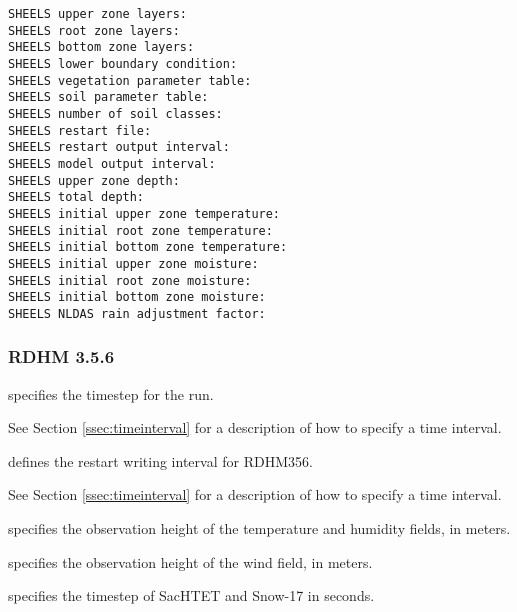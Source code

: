   

  

  

  

  
 

 \begin{Verbatim}[frame=single]
SHEELS upper zone layers:
SHEELS root zone layers:
SHEELS bottom zone layers:
SHEELS lower boundary condition:
SHEELS vegetation parameter table:
SHEELS soil parameter table:
SHEELS number of soil classes:
SHEELS restart file:
SHEELS restart output interval:
SHEELS model output interval:
SHEELS upper zone depth:
SHEELS total depth:
SHEELS initial upper zone temperature:
SHEELS initial root zone temperature:
SHEELS initial bottom zone temperature:
SHEELS initial upper zone moisture:
SHEELS initial root zone moisture:
SHEELS initial bottom zone moisture:
SHEELS NLDAS rain adjustment factor:
 \end{Verbatim}
 

 
 \subsubsection{RDHM 3.5.6} \label{sssec:lsm_rdhm356}
 

 
  specifies the timestep for the run.

 See Section \ref{ssec:timeinterval} for a description
 of how to specify a time interval.

  defines the restart
 writing interval for RDHM356.

 See Section \ref{ssec:timeinterval} for a description
 of how to specify a time interval.

  specifies the observation height of
 the temperature and humidity fields, in meters.

  specifies the observation height of
 the wind field, in meters.

  specifies the timestep
 of SacHTET and Snow-17 in seconds.

